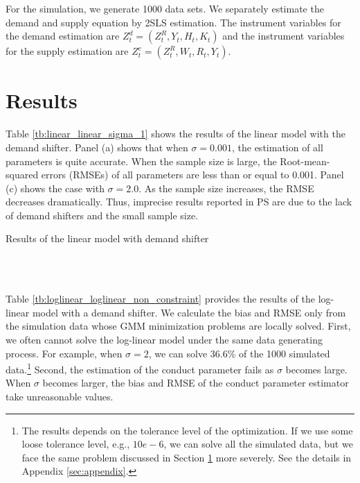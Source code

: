 \documentclass[11pt, a4paper]{article}
\begin{document}
For the simulation, we generate 1000 data sets.
We separately estimate the demand and supply equation by 2SLS estimation.
The instrument variables for the demand estimation are $Z^{d}_{t} = (Z^{R}_{t}, Y_t, H_{t}, K_{t})$ and the instrument variables for the supply estimation are $Z^{c}_{t} = (Z^{R}_{t}, W_{t}, R_t, Y_t)$. 


\section{Results}\label{sec:results}

Table \ref{tb:linear_linear_sigma_1} shows the results of the linear model with the demand shifter.
Panel (a) shows that when $\sigma = 0.001$, the estimation of all parameters is quite accurate.
When the sample size is large, the Root-mean-squared errors (RMSEs) of all parameters are less than or equal to 0.001. 
Panel (c) shows the case with $\sigma = 2.0$. As the sample size increases, the RMSE decreases dramatically. 
Thus, imprecise results reported in PS are due to the lack of demand shifters and the small sample size.



\begin{table}[!htbp]
  \begin{center}
      \caption{Results of the linear model with demand shifter}
      \label{tb:linear_linear_sigma_1} 
      \subfloat[$\sigma=0.001$]{}\\
      \subfloat[$\sigma=0.5$]{}\\
    \subfloat[$\sigma=2.0$]{}
  \end{center}
\end{table} 

Table \ref{tb:loglinear_loglinear_non_constraint} provides the results of the log-linear model with a demand shifter.
We calculate the bias and RMSE only from the simulation data whose GMM minimization problems are locally solved. 
First, we often cannot solve the log-linear model under the same data generating process. For example, when $\sigma=2$, we can solve 36.6\% of the 1000 simulated data.\footnote{The results depends on the tolerance level of the optimization. If we use some loose tolerance level, e.g., $10e-6$, we can solve all the simulated data, but we face the same problem discussed in Section \ref{sec:results} more severely. See the details in Appendix \ref{sec:appendix}.}
Second, the estimation of the conduct parameter fails as $\sigma$ becomes large. 
When $\sigma$ becomes larger, the bias and RMSE of the conduct parameter estimator take unreasonable values.
\end{document}
